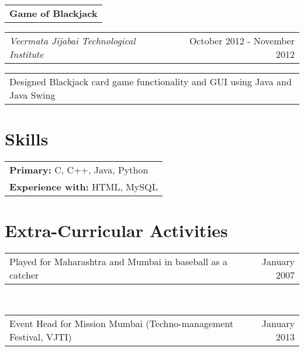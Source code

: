 \documentclass[margin,line]{res}
\begin{document}
\begin{resume}
\begin{tabular}{p{5.92in}}
\bf Game of Blackjack\\
\end{tabular}
\begin{tabular} {p{3.85in} r}
\it Veermata Jijabai Technological Institute & October 2012 - November 2012
\end{tabular}
\begin{tabular} {p{5.92in}}
Designed Blackjack card game functionality and GUI using Java and Java Swing 
\end{tabular}


\section{\sc\bf Skills}
\begin{tabular}{p{5.92in}}
{\bf Primary:} C, C++, Java, Python\\
{\bf Experience with:} HTML, MySQL
\end{tabular}

\section {\sc \bf Extra-Curricular Activities}
\begin{tabular}{p{4.9in} r}
Played for Maharashtra and Mumbai in baseball as a catcher & January 2007      
\end{tabular}\\
\begin{tabular} {p{4.9in} r}
Event Head for Mission Mumbai (Techno-management Festival, VJTI) & January 2013\\
\end{tabular}

\end{resume}
\end{document}
